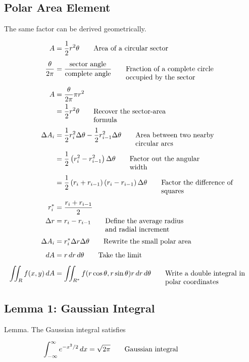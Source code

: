 \documentclass{article}
\newcommand{\justwidth}{0.36\textwidth}
\newcommand{\just}[1]{\parbox[t]{\justwidth}{\raggedright #1}}
\newlength{\defaultparwidth}
\newcommand{\defaultwidthpar}[1]{%
  \par
  \noindent\hfill
  \begin{minipage}{\defaultparwidth}%
  #1%
  \end{minipage}%
  \hfill\null
  \par
}
\begin{document}
\subsection{Polar Area Element}
\defaultwidthpar{The same factor can be derived geometrically.}

\begin{align*}
A
&=
\frac{1}{2}r^2\theta
\tag*{\just{Area of a circular sector}}
\\[0.45em]
\frac{\theta}{2\pi}
&=
\frac{\text{sector angle}}{\text{complete angle}}
\tag*{\just{Fraction of a complete circle occupied by the sector}}
\\[0.45em]
A
&=
\frac{\theta}{2\pi}
\pi r^2
\\
&=
\frac{1}{2}r^2\theta
\tag*{\just{Recover the sector-area formula}}
\\[0.45em]
\Delta A_i
&=
\frac{1}{2}r_i^2\Delta\theta
-
\frac{1}{2}r_{i-1}^2\Delta\theta
\tag*{\just{Area between two nearby circular arcs}}
\\[0.45em]
&=
\frac{1}{2}
\left(
r_i^2-r_{i-1}^2
\right)
\Delta\theta
\tag*{\just{Factor out the angular width}}
\\[0.45em]
&=
\frac{1}{2}
\left(
r_i+r_{i-1}
\right)
\left(
r_i-r_{i-1}
\right)
\Delta\theta
\tag*{\just{Factor the difference of squares}}
\\[0.45em]
r_i^*
&=
\frac{r_i+r_{i-1}}{2}
\\
\Delta r
&=
r_i-r_{i-1}
\tag*{\just{Define the average radius and radial increment}}
\\[0.45em]
\Delta A_i
&=
r_i^*
\Delta r
\Delta\theta
\tag*{\just{Rewrite the small polar area}}
\\[0.45em]
dA
&=
r\,dr\,d\theta
\tag*{\just{Take the limit}}
\\[0.45em]
\iint_R
f(x,y)\,dA
&=
\iint_{R^*}
f(r\cos\theta,r\sin\theta)
r\,dr\,d\theta
\tag*{\just{Write a double integral in polar coordinates}}
\end{align*}

\subsection{Lemma 1: Gaussian Integral}
Lemma. The Gaussian integral satisfies

\begin{align*}
\int_{-\infty}^{\infty}
e^{-x^2/2}\,dx
&=
\sqrt{2\pi}
\tag*{\just{Gaussian integral}}
\end{align*}
\end{document}

